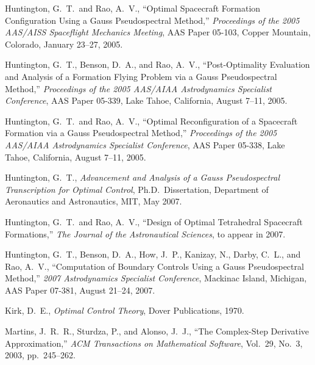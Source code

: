 \documentclass[10pt,final]{report}
\begin{document}
\begin{thebibliography}{}
   Huntington, G.~T.~and Rao,
  A.~V., ``Optimal Spacecraft Formation Configuration Using a Gauss
  Pseudospectral Method,'' {\em Proceedings of the 2005 AAS/AISS
  Spaceflight Mechanics Meeting}, AAS Paper 05-103, Copper Mountain,
  Colorado, January 23--27, 2005.

   Huntington, G.~T., Benson,
  D.~A., and Rao, A.~V., ``Post-Optimality Evaluation and Analysis of a
  Formation Flying Problem via a Gauss Pseudospectral Method,'' {\em
  Proceedings of the 2005 AAS/AIAA Astrodynamics Specialist
  Conference}, AAS Paper 05-339, Lake Tahoe, California, August 7--11,
  2005.

   Huntington, G.~T.~and Rao, A.~V.,
  ``Optimal Reconfiguration of a Spacecraft Formation via a Gauss
  Pseudospectral Method,'' {\em Proceedings of the 2005 AAS/AIAA
  Astrodynamics Specialist Conference}, AAS Paper 05-338, Lake Tahoe,
  California, August 7--11, 2005.

   Huntington, G.~T., {\em
    Advancement and Analysis of a Gauss Pseudospectral Transcription
    for Optimal Control}, Ph.D.~Dissertation, Department of
  Aeronautics and Astronautics, MIT, May 2007.

   Huntington, G.~T.~and Rao,
  A.~V., ``Design of Optimal Tetrahedral Spacecraft Formations,'' {\em The
    Journal of the Astronautical Sciences}, to appear in 2007.

   Huntington, G.~T.,
  Benson, D.~A., How, J.~P., Kanizay, N., Darby, C.~L., and Rao,
  A.~V., ``Computation of Boundary Controls Using a Gauss Pseudospectral
  Method,'' {\em 2007 Astrodynamics Specialist Conference}, Mackinac Island,
  Michigan, AAS Paper 07-381, August 21--24, 2007.


   Kirk, D.~E., {\em Optimal Control Theory},
  Dover Publications, 1970.

   Martins, J.~R.~R.,
  Sturdza, P., and Alonso, J.~J., ``The Complex-Step Derivative
  Approximation,'' {\em ACM Transactions on Mathematical Software},
  Vol.~29, No.~3, 2003, pp.~245--262.


\end{thebibliography}
\end{document}
